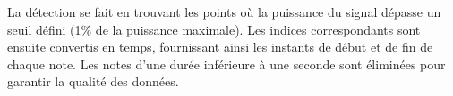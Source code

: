 La détection se fait en trouvant les points où la puissance du signal dépasse un seuil défini (1\% de la puissance maximale). Les indices correspondants sont ensuite convertis en temps, fournissant ainsi les instants de début et de fin de chaque note. Les notes d'une durée inférieure à une seconde sont éliminées pour garantir la qualité des données. 